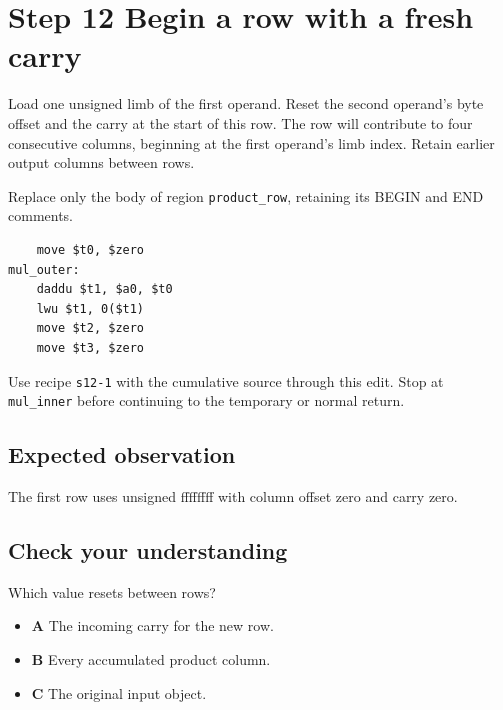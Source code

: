 \section{Step 12 Begin a row with a fresh carry}\label{rsa-s12}

Load one unsigned limb of the first operand. Reset the second operand's byte offset and the carry at the start of this row. The row will contribute to four consecutive columns, beginning at the first operand's limb index. Retain earlier output columns between rows.

Replace only the body of region \texttt{product\_row}, retaining its BEGIN and END comments.

\begin{verbatim}
    move $t0, $zero
mul_outer:
    daddu $t1, $a0, $t0
    lwu $t1, 0($t1)
    move $t2, $zero
    move $t3, $zero
\end{verbatim}

Use recipe \texttt{s12-1} with the cumulative source through this edit. Stop at \texttt{mul\_inner} before continuing to the temporary or normal return.

\subsection{Expected observation}
The first row uses unsigned ffffffff with column offset zero and carry zero.

\subsection{Check your understanding}
Which value resets between rows?

\begin{itemize}
\item \textbf{A} The incoming carry for the new row.
\item \textbf{B} Every accumulated product column.
\item \textbf{C} The original input object.
\end{itemize}
